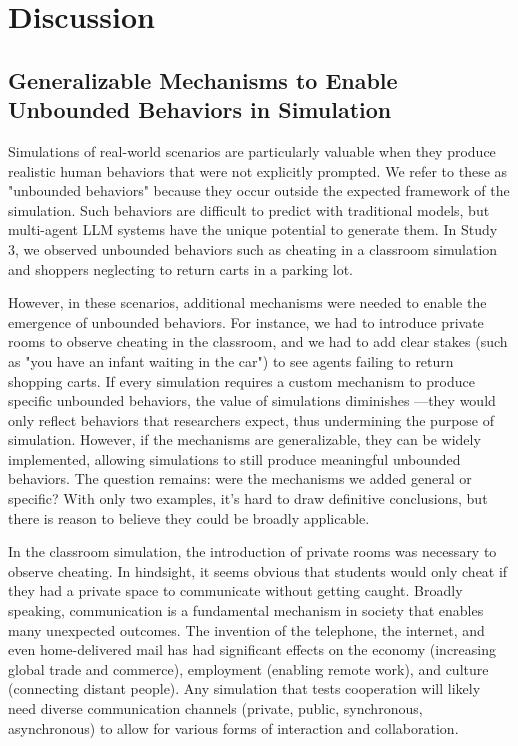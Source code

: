 \section{Discussion}
\subsection{Generalizable Mechanisms to Enable Unbounded Behaviors in Simulation}

Simulations of real-world scenarios are particularly valuable when they produce realistic human behaviors that were not explicitly prompted. We refer to these as "unbounded behaviors" because they occur outside the expected framework of the simulation. Such behaviors are difficult to predict with traditional models, but multi-agent LLM systems have the unique potential to generate them. In Study 3, we observed unbounded behaviors such as cheating in a classroom simulation and shoppers neglecting to return carts in a parking lot.%

However, in these scenarios, additional mechanisms were needed to enable the emergence of unbounded behaviors. For instance, we had to introduce private rooms to observe cheating in the classroom, and we had to add clear stakes (such as "you have an infant waiting in the car") to see agents failing to return shopping carts. %
If every simulation requires a custom mechanism to produce specific unbounded behaviors, the value of simulations diminishes —they would only reflect behaviors that researchers expect, thus undermining the purpose of simulation. However, if the mechanisms are generalizable, they can be widely implemented, allowing simulations to still produce meaningful unbounded behaviors. The question remains: were the mechanisms we added general or specific? With only two examples, it's hard to draw definitive conclusions, but there is reason to believe they could be broadly applicable.

In the classroom simulation, the introduction of private rooms was necessary to observe cheating. In hindsight, it seems obvious that students would only cheat if they had a private space to communicate without getting caught. Broadly speaking, communication is a fundamental mechanism in society that enables many unexpected outcomes. The invention of the telephone, the internet, and even home-delivered mail has had significant effects on the economy (increasing global trade and commerce), employment (enabling remote work), and culture (connecting distant people). Any simulation that tests cooperation will likely need diverse communication channels (private, public, synchronous, asynchronous) to allow for various forms of interaction and collaboration.

